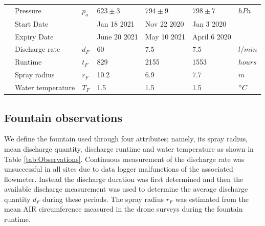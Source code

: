 \documentclass[utf8]{frontiersSCNS}
\begin{document}
\begin{table}
\begin{tabular}{@{}|lllllll|@{}}
		\multicolumn{1}{|l|}{} & Pressure                    & $p_a         $  & $623 \pm 3$   & $794 \pm 9$  &
		$798 \pm7$             & $hPa$                                                                                                     \\
		\multicolumn{1}{|l|}{} & Start Date         &     & Jan 18 2021   & Nov 22 2020
		                       & Jan 3 2020                       &                                                                      \\
		\multicolumn{1}{|l|}{} & Expiry Date      &     & June 20 2021 & May 10 2021
		                       & April 6 2020                &                                                                      \\\bottomrule
		\multicolumn{1}{|l|}{\multirow{4}{*}{\rotatebox[origin=c]{90}{Fountain}}}
		                       & Discharge rate             & $d_F     $      & $60$          & $7.5$        &
		$7.5$                  & $l/min$                                                                                                   \\
		\multicolumn{1}{|l|}{} & Runtime                     & $t_F $          & 829           & 2155
		                       & 1553                        & $hours$                                                                     \\
		\multicolumn{1}{|l|}{} & Spray radius                & $r_{F}$         & 10.2          & 6.9
		                       & 7.7                         & $m$                                                                         \\
		\multicolumn{1}{|l|}{} & Water temperature           & $T_{F}$         & 1.5             & 1.5
		                       & 1.5                         & $\degree C$                                                                 \\\midrule
	\end{tabular}
\end{table}


\subsection{Fountain observations}

We define the fountain used through four attributes; namely, its spray radius, mean discharge quantity, discharge
runtime and water temperature as shown in Table \ref{tab:Observations}. Continuous measurement of the discharge
rate was unsuccessful in all sites due to data logger malfunctions of the associated flowmeter. Instead the
discharge duration was first determined and then the available discharge measurement was used to determine the
average discharge quantity $d_F$ during these periods.  The spray radius $r_F$ was estimated from the mean AIR
circumference measured in the drone surveys during the fountain runtime.
\end{document}
